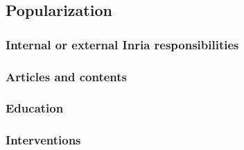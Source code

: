 \subsection{Popularization}
\label{DIVERSE:popularization}

\subsubsection{Internal or external Inria responsibilities}
\label{DIVERSE:popularization-resp}

\subsubsection{Articles and contents}
\label{DIVERSE:popularization-articles}

\subsubsection{Education}
\label{DIVERSE:popularization-education}

\subsubsection{Interventions}
\label{DIVERSE:popularization-intervention}
